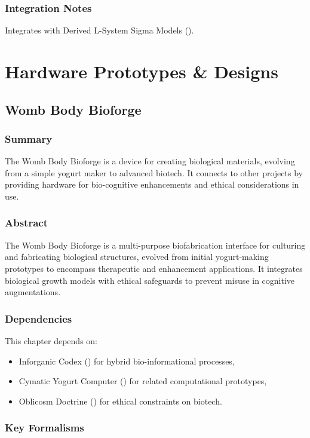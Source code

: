 \documentclass[11pt,oneside]{memoir}
\theoremstyle{plain}
\begin{document}
\section{Integration Notes}
Integrates with Derived L-System Sigma Models ().

\part{Hardware Prototypes \& Designs}

\chapter{Womb Body Bioforge}
\label{sec:womb_bioforge}

\section{Summary}
The Womb Body Bioforge is a device for creating biological materials, evolving from a simple yogurt maker to advanced biotech. It connects to other projects by providing hardware for bio-cognitive enhancements and ethical considerations in use.

\section{Abstract}
The Womb Body Bioforge is a multi-purpose biofabrication interface for culturing and fabricating biological structures, evolved from initial yogurt-making prototypes to encompass therapeutic and enhancement applications. It integrates biological growth models with ethical safeguards to prevent misuse in cognitive augmentations.

\section{Dependencies}
This chapter depends on:
\begin{itemize}
    \item Inforganic Codex () for hybrid bio-informational processes,
    \item Cymatic Yogurt Computer () for related computational prototypes,
    \item Oblicosm Doctrine () for ethical constraints on biotech.
\end{itemize}

\section{Key Formalisms}
\end{document}
